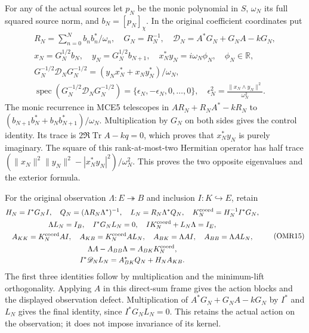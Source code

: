\documentclass[11pt,a4paper]{article}
\begin{document}
For any of the actual sources let $p_N$ be the monic polynomial
in $S$, $\omega_N$ its full squared source norm, and $b_N=[p_N]_\chi$.
In the original coefficient coordinates put
\[
 \begin{gathered}
 R_N=\sum_{n=0}^N b_nb_n^*/\omega_n,\quad G_N=R_N^{-1},\quad
 \mathscr D_N=A^*G_N+G_NA-kG_N,\\
 x_N=G_N^{1/2}b_N,\quad y_N=G_N^{1/2}b_{N+1},\quad
 x_N^*y_N=i\omega_N\phi_N,\quad \phi_N\in\mathbb R,\\
 G_N^{-1/2}\mathscr D_NG_N^{-1/2}
       =(y_Nx_N^*+x_Ny_N^*)/\omega_N,\\
 \operatorname{spec}(G_N^{-1/2}\mathscr D_NG_N^{-1/2})
       =\{\epsilon_N,-\epsilon_N,0,\ldots,0\},\quad
 \epsilon_N^2=\frac{\|x_N\wedge y_N\|^2}{\omega_N^2}.
 \end{gathered}\tag{OMR14}
\]
The monic recurrence in MCE5 telescopes in $AR_N+R_NA^*-kR_N$
to $(b_{N+1}b_N^*+b_Nb_{N+1}^*)/\omega_N$.
Multiplication by $G_N$ on both sides gives the control identity.
Its trace is $2\Re\operatorname{Tr}A-kq=0$, which proves that
$x_N^*y_N$ is purely imaginary. The square of this rank-at-most-two
Hermitian operator has half trace
$(\|x_N\|^2\|y_N\|^2-|x_N^*y_N|^2)/\omega_N^2$.
This proves the two opposite eigenvalues and the exterior formula.

For the original observation $\Lambda:E\twoheadrightarrow B$
and inclusion $I:K\hookrightarrow E$, retain
\[
 \begin{gathered}
 H_N=I^*G_NI,\quad Q_N=(\Lambda R_N\Lambda^*)^{-1},\quad
 L_N=R_N\Lambda^*Q_N,\quad K_N^{\rm coord}=H_N^{-1}I^*G_N,\\
 \Lambda L_N=I_B,\quad I^*G_NL_N=0,\quad
 I K_N^{\rm coord}+L_N\Lambda=I_E,\\
 A_{KK}=K_N^{\rm coord}AI,\quad A_{KB}=K_N^{\rm coord}AL_N,\quad
 A_{BK}=\Lambda AI,\quad A_{BB}=\Lambda AL_N,\\
 \Lambda A-A_{BB}\Lambda=A_{BK}K_N^{\rm coord},\\
 I^*\mathscr D_NL_N=A_{BK}^*Q_N+H_NA_{KB}.
 \end{gathered}\tag{OMR15}
\]
The first three identities follow by multiplication and the
minimum-lift orthogonality. Applying $A$ in this direct-sum frame
gives the action blocks and the displayed observation defect.
Multiplication of $A^*G_N+G_NA-kG_N$ by $I^*$ and $L_N$
gives the final identity, since $I^*G_NL_N=0$. This retains the
actual action on the observation; it does not impose invariance
of its kernel.
\end{document}
